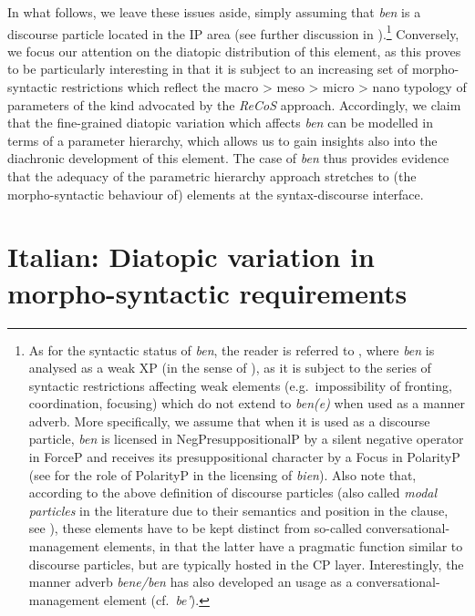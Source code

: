 \documentclass[output=paper]{langsci/langscibook}
\begin{document}
In what follows, we leave these issues aside, simply assuming that 
\emph{ben} is a discourse particle located in the IP area (see further
discussion in \citealt{CognSchi2018b,CognSchi2018}).\footnote{As for the
    syntactic status of \emph{ben}, the reader is referred to
    \textcite{CognSchi2015,CognSchi2018b,CognSchi2018}, where \emph{ben} is
    analysed as a weak XP (in the sense of \citealt{CarSta1999}), as it is
    subject to the series of syntactic restrictions affecting weak elements
    (e.g.\ impossibility of fronting, coordination, focusing) which do not
    extend to \emph{ben(e)} when used as a manner adverb. More specifically, we
    assume that when it is used as a discourse particle, \emph{ben} is licensed
    in NegPresuppositionalP by a silent negative operator in ForceP and
    receives its presuppositional character by a Focus in PolarityP (see
    \citealt{Hernanz2010} for the role of PolarityP in the licensing of 
    \emph{bien}). Also note that, according to the above definition of
    discourse particles (also called \emph{modal particles} in the literature
    due to their semantics and position in the clause, see
    \citealt{Weydt1969}), these elements have to be kept distinct from
    so-called conversational-management elements, in that the latter have a
    pragmatic function similar to discourse particles, but are typically hosted
    in the CP layer. Interestingly, the  manner adverb \emph{bene/ben}
    has also developed an usage as a conversational-management element (cf.\
\emph{be’}).} Conversely, we focus our attention on the diatopic
distribution of this element, as this proves to be particularly interesting in
that it is subject to an increasing set of morpho-syntactic restrictions which
reflect the macro > meso > micro > nano typology of parameters of the kind
advocated by the \emph{ReCoS} approach.  Accordingly, we claim that the
fine-grained diatopic variation which affects \ili{Italian} \emph{ben} can be
modelled in terms of a parameter hierarchy,\is{parameter hierarchies} which allows us to gain insights
also into the diachronic development of this element. The case of \ili{Italian}
\emph{ben} thus provides evidence that the adequacy of the parametric hierarchy
approach stretches to (the morpho-syntactic behaviour of) elements at the
syntax-discourse interface.

\section{Italian: Diatopic variation in morpho-syntactic requirements}\label{sec:23-diatopic}
\end{document}
